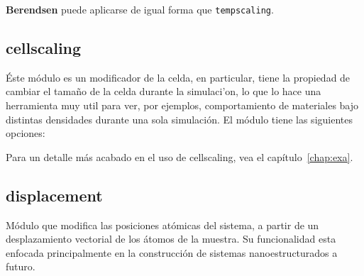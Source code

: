 
\textbf{Berendsen} puede aplicarse de igual forma que \verb|tempscaling|.

\subsection{cellscaling}
\'Este m\'odulo es un modificador de la celda, en particular, tiene la propiedad de cambiar el tama\~no de la celda durante la simulaci'on, lo que lo hace una herramienta muy util para ver, por ejemplos, comportamiento de materiales bajo distintas densidades durante una sola simulaci\'on. El m\'odulo tiene las siguientes opciones:


Para un detalle m\'as acabado en el uso de cellscaling, vea el cap\'itulo~\ref{chap:exa}.

\subsection{displacement}
M\'odulo que modifica las posiciones at\'omicas del sistema, a partir de un desplazamiento vectorial de los \'atomos de la muestra. Su funcionalidad esta enfocada principalmente en la construcci\'on de sistemas nanoestructurados a futuro.


